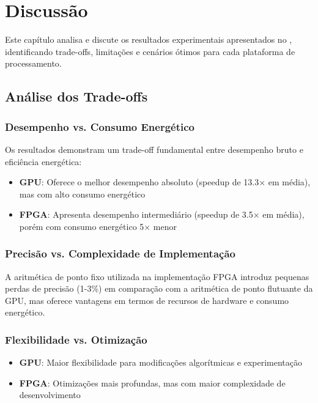 \chapter{Discussão}\label{chp:discussao}

Este capítulo analisa e discute os resultados experimentais apresentados no , identificando trade-offs, limitações e cenários ótimos para cada plataforma de processamento.

\section{Análise dos Trade-offs}\label{sec:tradeoffs}

\subsection{Desempenho vs. Consumo Energético}
Os resultados demonstram um trade-off fundamental entre desempenho bruto e eficiência energética:

\begin{itemize}
    \item \textbf{GPU}: Oferece o melhor desempenho absoluto (speedup de 13.3× em média), mas com alto consumo energético
    \item \textbf{FPGA}: Apresenta desempenho intermediário (speedup de 3.5× em média), porém com consumo energético 5× menor
\end{itemize}


\subsection{Precisão vs. Complexidade de Implementação}
A aritmética de ponto fixo utilizada na implementação FPGA introduz pequenas perdas de precisão (1-3\%) em comparação com a aritmética de ponto flutuante da GPU, mas oferece vantagens em termos de recursos de hardware e consumo energético.

\subsection{Flexibilidade vs. Otimização}
\begin{itemize}
    \item \textbf{GPU}: Maior flexibilidade para modificações algorítmicas e experimentação
    \item \textbf{FPGA}: Otimizações mais profundas, mas com maior complexidade de desenvolvimento
\end{itemize}

